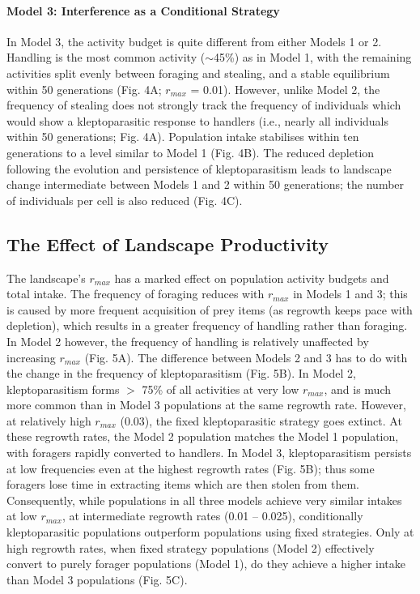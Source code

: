 \documentclass[11pt]{article}
\begin{document}
\paragraph{Model 3: Interference as a Conditional Strategy}

In Model 3, the activity budget is quite different from either Models 1 or 2.
Handling is the most common activity ($\sim$45\%) as in Model 1, with the remaining activities split evenly between foraging and stealing, and a stable equilibrium within 50 generations (Fig. 4A; $r_{max}$ = 0.01).
However, unlike Model 2, the frequency of stealing does not strongly track the frequency of individuals which would show a kleptoparasitic response to handlers (i.e., nearly all individuals within 50 generations; Fig. 4A).
Population intake stabilises within ten generations to a level similar to Model 1 (Fig. 4B).
The reduced depletion following the evolution and persistence of kleptoparasitism leads to landscape change intermediate between Models 1 and 2 within 50 generations; the number of individuals per cell is also reduced (Fig. 4C).

\subsection{The Effect of Landscape Productivity}

The landscape's $r_{max}$ has a marked effect on population activity budgets and total intake.
The frequency of foraging reduces with $r_{max}$ in Models 1 and 3; this is caused by more frequent acquisition of prey items (as regrowth keeps pace with depletion), which results in a greater frequency of handling rather than foraging.
In Model 2 however, the frequency of handling is relatively unaffected by increasing $r_{max}$ (Fig. 5A).
The difference between Models 2 and 3 has to do with the change in the frequency of kleptoparasitism (Fig. 5B).
In Model 2, kleptoparasitism forms $>$ 75\% of all activities at very low $r_{max}$, and is much more common than in Model 3 populations at the same regrowth rate.
However, at relatively high $r_{max}$ (0.03), the fixed kleptoparasitic strategy goes extinct.
At these regrowth rates, the Model 2 population matches the Model 1 population, with foragers rapidly converted to handlers.
In Model 3, kleptoparasitism persists at low frequencies even at the highest regrowth rates (Fig. 5B); thus some foragers lose time in extracting items which are then stolen from them.
Consequently, while populations in all three models achieve very similar intakes at low $r_{max}$, at intermediate regrowth rates (0.01 -- 0.025), conditionally kleptoparasitic populations outperform populations using fixed strategies.
Only at high regrowth rates, when fixed strategy populations (Model 2) effectively convert to purely forager populations (Model 1), do they achieve a higher intake than Model 3 populations (Fig. 5C).
\end{document}
